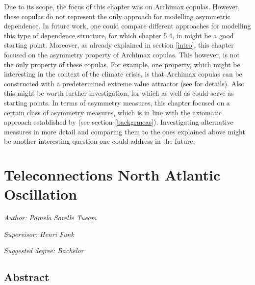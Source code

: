 \documentclass[
]{krantz}
\begin{document}
Due to its scope, the focus of this chapter was on Archimax copulas. However, these copulas do not represent the only approach for modelling asymmetric dependence. In future work, one could compare different approaches for modelling this type of dependence structure, for which chapter 5.4, in \citet{genest2013} might be a good starting point. Moreover, as already explained in section \ref{intro}, this chapter focused on the asymmetry property of Archimax copulas. This however, is not the only property of these copulas. For example, one property, which might be interesting in the context of the climate crisis, is that Archimax copulas can be constructed with a predetermined extreme value attractor (see \citet{caperaa2000} for details). Also this might be worth further investigation, for which \citet{caperaa2000} as well as \citet{chatelain2020} could serve as starting points. In terms of asymmetry measures, this chapter focused on a certain class of asymmetry measures, which is in line with the axiomatic approach established by \citet{durante2010a} (see section \ref{backgrmeas}). Investigating alternative measures in more detail and comparing them to the ones explained above might be another interesting question one could address in the future.

\chapter{Teleconnections North Atlantic Oscillation}\label{nao}

\emph{Author: Pamela Sorelle Tueam}

\emph{Supervisor: Henri Funk}

\emph{Suggested degree: Bachelor}

\section{Abstract}\label{abstract-2}
\end{document}
